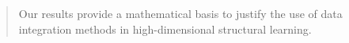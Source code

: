 \documentclass[bj,authoryear]{imsart}
\theoremstyle{plain}
\newcommand{\david}[1]{{\small{\color{blue} \sf $\heartsuit$ [David: #1]}}}
\newcommand{\piotr}[1]{{\small{\color{red} \sf $\clubsuit$ Piotr: #1}}}
\newcommand{\paul}[1]{{\small{\color{green} \sf $\spadesuit$ Paul: #1}}}
\begin{document}
\begin{frontmatter}
\begin{abstract}
Our results provide a mathematical basis to justify the use of data integration methods in high-dimensional structural learning.

\end{abstract}



\begin{keyword}[class=MSC]
\end{keyword}

\begin{keyword}
\end{keyword}
\end{frontmatter}



\end{document}
